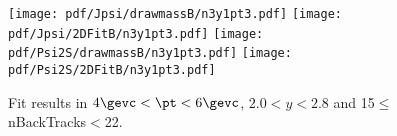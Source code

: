 \begin{figure}[H]
\begin{center}
\texttt{[image: pdf/Jpsi/drawmassB/n3y1pt3.pdf]}
\texttt{[image: pdf/Jpsi/2DFitB/n3y1pt3.pdf]}
\vspace*{-0.5cm}
\texttt{[image: pdf/Psi2S/drawmassB/n3y1pt3.pdf]}
\texttt{[image: pdf/Psi2S/2DFitB/n3y1pt3.pdf]}
\vspace*{-0.5cm}
\end{center}
\caption{Fit results in $4\gevc<\pt<6\gevc$, $2.0<y<2.8$ and 15$\leq$nBackTracks$<$22.}
\label{Fitn3y1pt3}
\end{figure}
